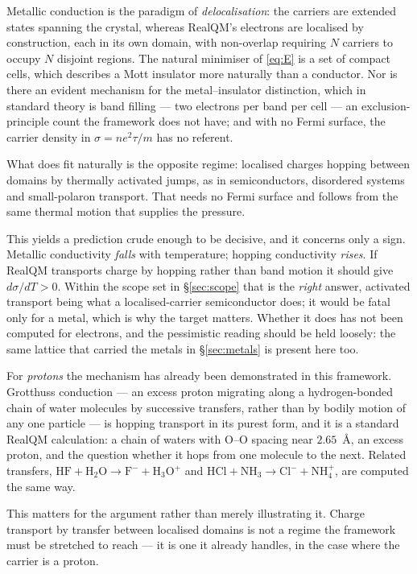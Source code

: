 \documentclass[11pt]{article}
\begin{document}
Metallic conduction is the paradigm of \emph{delocalisation}: the carriers are extended states
spanning the crystal, whereas RealQM's electrons are localised by construction, each in its own
domain, with non-overlap requiring $N$ carriers to occupy $N$ disjoint regions. The natural minimiser
of \eqref{eq:E} is a set of compact cells, which describes a Mott insulator more naturally than a
conductor. Nor is there an evident mechanism for the metal--insulator distinction, which in standard
theory is band filling --- two electrons per band per cell --- an exclusion-principle count the
framework does not have; and with no Fermi surface, the carrier density in $\sigma=ne^2\tau/m$ has no
referent.

What does fit naturally is the opposite regime: localised charges hopping between domains by
thermally activated jumps, as in semiconductors, disordered systems and small-polaron transport. That
needs no Fermi surface and follows from the same thermal motion that supplies the pressure.

This yields a prediction crude enough to be decisive, and it concerns only a sign. Metallic
conductivity \emph{falls} with temperature; hopping conductivity \emph{rises}. If RealQM transports
charge by hopping rather than band motion it should give $d\sigma/dT>0$. Within the scope set in
\S\ref{sec:scope} that is the \emph{right} answer, activated transport being what a localised-carrier
semiconductor does; it would be fatal only for a metal, which is why the target matters. Whether it does has not been computed for electrons, and the
pessimistic reading should be held loosely: the same lattice that carried the metals in \S\ref{sec:metals} is
present here too.

For \emph{protons} the mechanism has already been demonstrated in this framework. Grotthuss
conduction --- an excess proton migrating along a hydrogen-bonded chain of water molecules by
successive transfers, rather than by bodily motion of any one particle --- is hopping transport in
its purest form, and it is a standard RealQM calculation: a chain of waters with $\mathrm{O}$--$\mathrm{O}$
spacing near $2.65$~\AA{}, an excess proton, and the question whether it hops from one molecule to
the next. Related transfers, $\mathrm{HF}+\mathrm{H_2O}\to\mathrm{F^-}+\mathrm{H_3O^+}$ and
$\mathrm{HCl}+\mathrm{NH_3}\to\mathrm{Cl^-}+\mathrm{NH_4^+}$, are computed the same way.

This matters for the argument rather than merely illustrating it. Charge transport by transfer
between localised domains is not a regime the framework must be stretched to reach --- it is one it
already handles, in the case where the carrier is a proton.
\end{document}

